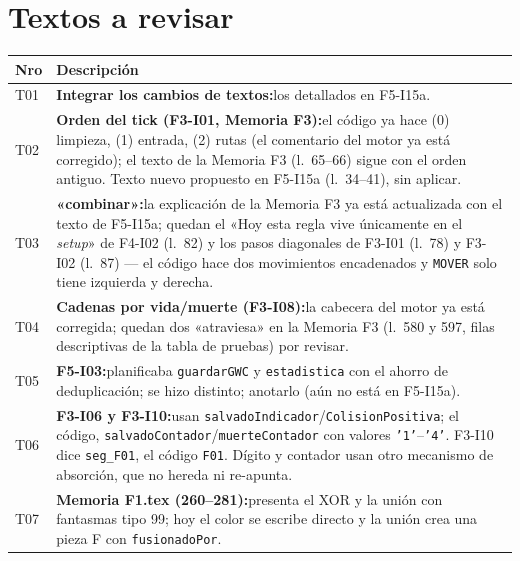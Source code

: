\section*{Textos a revisar}

\begin{xltabular}{\textwidth}{l >{\RaggedRight\arraybackslash}X}
	\toprule
	\textbf{Nro} & \textbf{Descripción} \\
	\midrule
	\endhead
	T01 & \textbf{Integrar los cambios de textos:}\newline los detallados en F5-I15a. \\
	\midrule
	T02 & \textbf{Orden del tick (F3-I01, Memoria F3):}\newline el código ya hace (0) limpieza, (1) entrada, (2) rutas (el comentario del motor ya está corregido); el texto de la Memoria F3 (l.~65--66) sigue con el orden antiguo. Texto nuevo propuesto en F5-I15a (l.~34--41), sin aplicar. \\
	\midrule
	T03 & \textbf{«combinar»:}\newline la explicación de la Memoria F3 ya está actualizada con el texto de F5-I15a; quedan el «Hoy esta regla vive únicamente en el \textit{setup}» de F4-I02 (l.~82) y los pasos diagonales de F3-I01 (l.~78) y F3-I02 (l.~87) --- el código hace dos movimientos encadenados y \texttt{MOVER} solo tiene izquierda y derecha. \\
	\midrule
	T04 & \textbf{Cadenas por vida/muerte (F3-I08):}\newline la cabecera del motor ya está corregida; quedan dos «atraviesa» en la Memoria F3 (l.~580 y 597, filas descriptivas de la tabla de pruebas) por revisar. \\
	\midrule
	T05 & \textbf{F5-I03:}\newline planificaba \texttt{guardarGWC} y \texttt{estadistica} con el ahorro de deduplicación; se hizo distinto; anotarlo (aún no está en F5-I15a). \\
	\midrule
	T06 & \textbf{F3-I06 y F3-I10:}\newline usan \texttt{salvadoIndicador}/\texttt{ColisionPositiva}; el código, \texttt{salvadoContador}/\texttt{muerteContador} con valores \texttt{'1'}--\texttt{'4'}. F3-I10 dice \texttt{seg\_F01}, el código \texttt{F01}. Dígito y contador usan otro mecanismo de absorción, que no hereda ni re-apunta. \\
	\midrule
	T07 & \textbf{Memoria F1.tex (260--281):}\newline presenta el XOR y la unión con fantasmas tipo 99; hoy el color se escribe directo y la unión crea una pieza F con \texttt{fusionadoPor}. \\

\end{xltabular}
